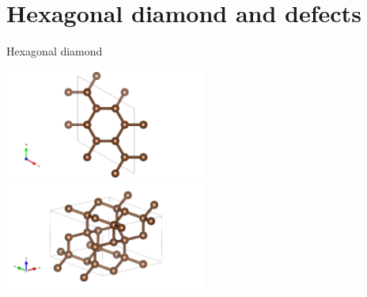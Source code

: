 \documentclass[notes=show]{beamer}
\begin{document}


\section{Hexagonal diamond and defects} %


\begin{frame}{Hexagonal diamond}
  \begin{center}
    \includegraphics[width=0.5\textwidth, trim=0 0 30em 0,clip]{images/poscar_hex_16_hex-view.png}\\
    \includegraphics[width=0.5\textwidth, trim=0 0 27em 0,clip]{images/poscar_hex_16_birdseye.png}
  \end{center}
\end{frame}
\end{document}
